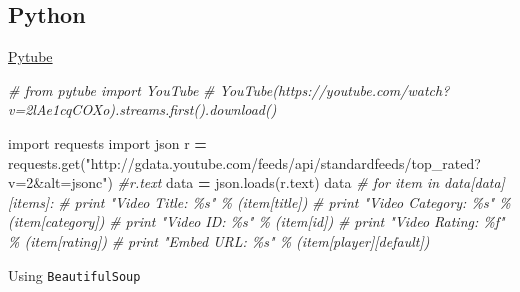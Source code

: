 \documentclass[
]{book}
\newenvironment{Shaded}{\begin{snugshade}}{\end{snugshade}}
\newcommand{\CommentTok}[1]{\textcolor[rgb]{0.56,0.35,0.01}{\textit{#1}}}
\newcommand{\ImportTok}[1]{#1}
\newcommand{\NormalTok}[1]{#1}
\newcommand{\OperatorTok}[1]{\textcolor[rgb]{0.81,0.36,0.00}{\textbf{#1}}}
\newcommand{\StringTok}[1]{\textcolor[rgb]{0.31,0.60,0.02}{#1}}
\begin{document}
\hypertarget{python}{%
\subsection{Python}\label{python}}

\href{https://github.com/pytube/pytube}{Pytube}

\begin{Shaded}
\begin{Highlighting}[]
\CommentTok{\# from pytube import YouTube}
\CommentTok{\# YouTube(\textquotesingle{}https://youtube.com/watch?v=2lAe1cqCOXo\textquotesingle{}).streams.first().download()}
\end{Highlighting}
\end{Shaded}

\begin{Shaded}
\begin{Highlighting}[]
\ImportTok{import}\NormalTok{ requests}
\ImportTok{import}\NormalTok{ json}
\NormalTok{r }\OperatorTok{=}\NormalTok{ requests.get(}\StringTok{"http://gdata.youtube.com/feeds/api/standardfeeds/top\_rated?v=2\&alt=jsonc"}\NormalTok{)}
\CommentTok{\#r.text}
\NormalTok{data }\OperatorTok{=}\NormalTok{ json.loads(r.text)}
\NormalTok{data}
\CommentTok{\# for item in data[\textquotesingle{}data\textquotesingle{}][\textquotesingle{}items\textquotesingle{}]:}
\CommentTok{\#   print "Video Title: \%s" \% (item[\textquotesingle{}title\textquotesingle{}])}
\CommentTok{\#   print "Video Category: \%s" \% (item[\textquotesingle{}category\textquotesingle{}])}
\CommentTok{\#   print "Video ID: \%s" \% (item[\textquotesingle{}id\textquotesingle{}])}
\CommentTok{\#   print "Video Rating: \%f" \% (item[\textquotesingle{}rating\textquotesingle{}])}
\CommentTok{\#   print "Embed URL: \%s" \% (item[\textquotesingle{}player\textquotesingle{}][\textquotesingle{}default\textquotesingle{}])}
\end{Highlighting}
\end{Shaded}

Using \texttt{BeautifulSoup}
\end{document}
